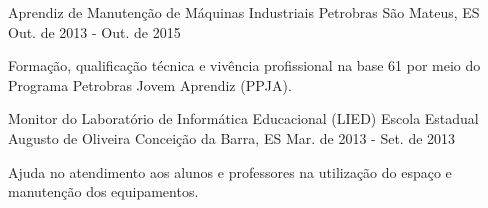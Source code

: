 \begin{cventries}
\cventry
{Aprendiz de Manutenção de Máquinas Industriais} %
{Petrobras} %
{São Mateus, ES} %
{Out. de 2013 - Out. de 2015} %
{
	      \begin{cvitems} %
	        \item {Formação, qualificação técnica e vivência profissional na base 61 por meio do Programa Petrobras Jovem Aprendiz (PPJA).}
	      \end{cvitems}
}
%
  \cventry
    {Monitor do Laboratório de Informática Educacional (LIED)} %
    {Escola Estadual Augusto de Oliveira} %
    {Conceição da Barra, ES} %
    {Mar. de 2013 - Set. de 2013} %
    {
      \begin{cvitems} %
        \item {Ajuda no atendimento aos alunos e professores na utilização do espaço e manutenção dos equipamentos.}
      \end{cvitems}
    }
%
%

\end{cventries}
